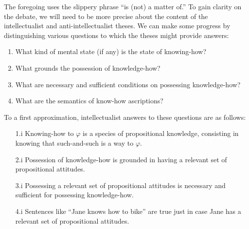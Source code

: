 \documentclass{article}
\begin{document}
The foregoing uses the slippery phrase ``is (not) a matter of.''
To gain clarity on the debate, we will need to be more precise about the content of the intellectualist and anti-intellectualist theses.
We can make some progress by distinguishing various questions to which the theses might provide answers:
\begin{enumerate}
	\item What kind of mental state (if any) is the state of knowing-how?
	\item What grounds the possession of knowledge-how?
	\item What are necessary and sufficient conditions on possessing knowledge-how?
	\item What are the semantics of know-how ascriptions?
\end{enumerate}
To a first approximation, intellectualist answers to these questions are as follows: 
\begin{enumerate}
	\item [1.i] Knowing-how to $\varphi$ is a species of propositional knowledge, consisting in knowing that such-and-such is a way to $\varphi$.
	\item [2.i] Possession of knowledge-how is grounded in having a relevant set of propositional attitudes.
	\item [3.i] Possessing a relevant set of propositional attitudes is necessary and sufficient for possessing knowledge-how.
	\item [4.i] Sentences like ``Jane knows how to bike'' are true just in case Jane has a relevant set of propositional attitudes.
\end{enumerate}
\end{document}

